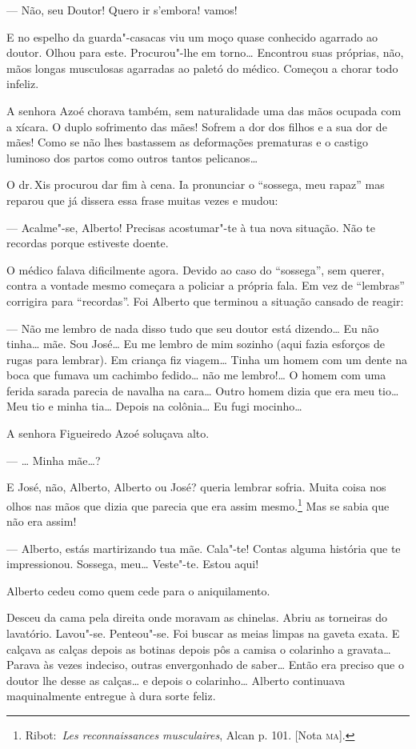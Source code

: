 --- Não, seu Doutor! Quero ir s'embora! vamos!

E no espelho da guarda"-casacas viu um moço quase conhecido agarrado ao
doutor. Olhou para este. Procurou"-lhe em torno\ldots{} Encontrou suas
próprias, não, mãos longas musculosas agarradas ao paletó do médico.
Começou a chorar todo infeliz.

A senhora Azoé chorava também, sem naturalidade uma das mãos ocupada com
a xícara. O duplo sofrimento das mães! Sofrem a dor dos filhos e a sua
dor de mães! Como se não lhes bastassem as deformações prematuras e o
castigo luminoso dos partos como outros tantos pelicanos\ldots{}

O dr.\,Xis procurou dar fim à cena. Ia pronunciar o ``sossega, meu
rapaz'' mas reparou que já dissera essa frase muitas vezes e mudou:

--- Acalme"-se, Alberto! Precisas acostumar"-te à tua nova situação. Não
te recordas porque estiveste doente.

O médico falava dificilmente agora. Devido ao caso do ``sossega'', sem
querer, contra a vontade mesmo começara a policiar a própria fala. Em
vez de ``lembras'' corrigira para ``recordas''. Foi Alberto que terminou
a situação cansado de reagir:

--- Não me lembro de nada disso tudo que seu doutor está dizendo\ldots{} Eu
não tinha\ldots{} mãe. Sou José\ldots{} Eu me lembro de mim sozinho (aqui fazia
esforços de rugas para lembrar). Em criança fiz viagem\ldots{} Tinha um homem
com um dente na boca que fumava um cachimbo fedido\ldots{} não me lembro!\ldots{}
O homem com uma ferida sarada parecia de navalha na cara\ldots{} Outro homem
dizia que era meu tio\ldots{} Meu tio e minha tia\ldots{} Depois na colônia\ldots{} Eu
fugi mocinho\ldots{}

A senhora Figueiredo Azoé soluçava alto.

--- \ldots{} Minha mãe\ldots{}?

E José, não, Alberto, Alberto ou José? queria lembrar sofria. Muita
coisa nos olhos nas mãos que dizia que parecia que era assim
mesmo.\footnote{Ribot:~\emph{Les reconnaissances musculaires}, Alcan p.
  101. {[}Nota \textsc{ma}{]}.} Mas se sabia que não era assim!

--- Alberto, estás martirizando tua mãe. Cala"-te! Contas alguma história
que te impressionou. Sossega, meu\ldots{} Veste"-te. Estou aqui!

Alberto cedeu como quem cede para o aniquilamento.

Desceu da cama pela direita onde moravam as chinelas. Abriu as torneiras
do lavatório. Lavou"-se. Penteou"-se. Foi buscar as meias limpas na gaveta
exata. E calçava as calças depois as botinas depois pôs a camisa o
colarinho a gravata\ldots{} Parava às vezes indeciso, outras envergonhado de
saber\ldots{} Então era preciso que o doutor lhe desse as calças\ldots{} e depois
o colarinho\ldots{} Alberto continuava maquinalmente entregue à dura sorte
feliz.

